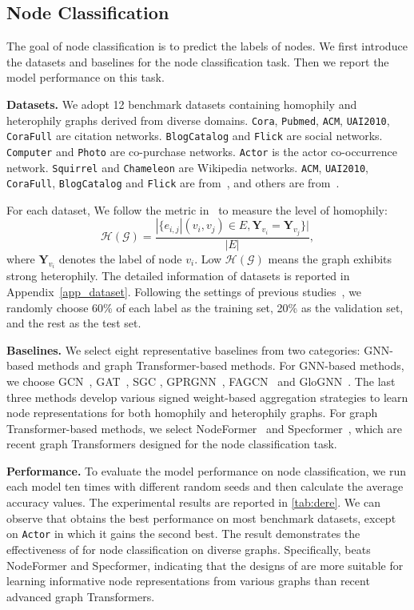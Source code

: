 \documentclass[sigconf, screen]{acmart}
\begin{document}
\subsection{Node Classification}
The goal of node classification is to predict the labels of nodes.
We first introduce the datasets and baselines for the node classification task.
Then we report the model performance on this task.

\textbf{Datasets.} 
We adopt 12 benchmark datasets containing homophily and heterophily graphs derived from diverse domains. 
\texttt{Cora}, \texttt{Pubmed}, \texttt{ACM}, \texttt{UAI2010}, \texttt{CoraFull} are citation networks.
\texttt{BlogCatalog} and \texttt{Flick} are social networks.
\texttt{Computer} and \texttt{Photo} are co-purchase networks.
\texttt{Actor} is the actor co-occurrence network.
\texttt{Squirrel} and \texttt{Chameleon} are Wikipedia networks. 
\texttt{ACM}, \texttt{UAI2010}, \texttt{CoraFull}, \texttt{BlogCatalog} and \texttt{Flick} are from~\cite{amgcn}, and others are from~\cite{gprgnn}.

For each dataset, We follow the metric in~\cite{glognn} to measure the level of homophily:
\begin{equation}
    \mathcal{H}(\mathcal{G}) =  \frac{|\{e_{i,j} |(v_i,v_j)\in E, \mathbf{Y}_{v_i}=\mathbf{Y}_{v_j}\}|}{|E|},
\end{equation}
where $\mathbf{Y}_{v_i}$ denotes the label of node ${v_i}$.
Low $\mathcal{H}(\mathcal{G})$ means the graph exhibits strong heterophily.
The detailed information of datasets is reported in Appendix~\ref{app_dataset}.
Following the settings of previous studies~\cite{fagcn,gprgnn,specformer}, we randomly choose 60\% of each label as the training set, 20\% as the validation set, and the rest as the test set.

\textbf{Baselines.}
We select eight representative baselines from two categories: 
GNN-based methods and graph Transformer-based methods.
For GNN-based methods, we choose GCN~\cite{gcn}, GAT~\cite{gat}, SGC \cite{sgc}, GPRGNN~\cite{gprgnn}, FAGCN~\cite{fagcn} and GloGNN~\cite{glognn}.
The last three methods develop various signed weight-based aggregation strategies to learn node representations for both homophily and heterophily graphs.
For graph Transformer-based methods, we select NodeFormer~\cite{nodeformer} and Specformer~\cite{specformer}, which are recent graph Transformers designed for the node classification task.

\textbf{Performance.}
To evaluate the model performance on node classification,
we run each model ten times with different random seeds and then calculate the average accuracy values. 
The experimental results are reported in \autoref{tab:dere}.
We can observe that \name obtains the best performance on most benchmark datasets, except on \texttt{Actor} in which it gains the second best.
The result demonstrates the effectiveness of \name for node classification on diverse graphs. 
Specifically, \name beats NodeFormer and Specformer, indicating that the designs of \name are more suitable for learning informative node representations from various graphs than recent advanced graph Transformers. 
\end{document}
